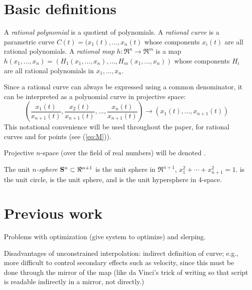 
\section{Basic definitions}

\begin{defn2}
{\rm 
A {\em rational polynomial} is a quotient of polynomials.
A {\em rational curve} is a parametric curve $C(t) = (x_1(t),\ldots,x_n(t)$ 
whose components $x_i(t)$ are all rational polynomials.
A {\em rational map} $h:\Re^n \rightarrow \Re^m$ is a map
$h(x_1,\ldots,x_n) = (H_1 (x_1,\ldots,x_n),\ldots,H_m (x_1,\ldots,x_n))$
whose components $H_i$ are all rational polynomials in $x_1,\ldots,x_n$.
}
\end{defn2}

Since a rational curve can always be expressed using a common denominator,
it can be interpreted as a polynomial curve in projective space:
\[ 
  (\frac{x_1(t)}{x_{n+1}(t)}, \frac{x_2(t)}{x_{n+1}(t)}, \ldots, 
   \frac{x_n(t)}{x_{n+1}(t)})  \rightarrow (x_1(t),\ldots,x_{n+1}(t))
\]
This notational convenience will be used throughout the paper,
for rational curves and for points (see (\ref{eq:M})).

\begin{notation}
{\rm 
Projective $n$-space (over the field of real numbers) will be denoted .
}
\end{notation}

\begin{defn2}
{\rm
The unit {\em $n$-sphere} $\mbox{{\bf S}$^{n}$} \subset \Re^{n+1}$ 
is the unit sphere in $\Re^{n+1}$, $x_1^2 + \cdots + x_{n+1}^2 = 1$.
 is the unit circle,  is the unit sphere, and  is the
unit hypersphere in 4-space.
}
\end{defn2}


\section{Previous work}

Problems with optimization (give system to optimize) and slerping.

Disadvantages of unconstrained interpolation: indirect definition of curve;
e.g., more difficult to control secondary effects such as velocity,
since this must be done through the mirror of the map
(like da Vinci's trick of writing so that script is readable indirectly in a mirror,
not directly.)

